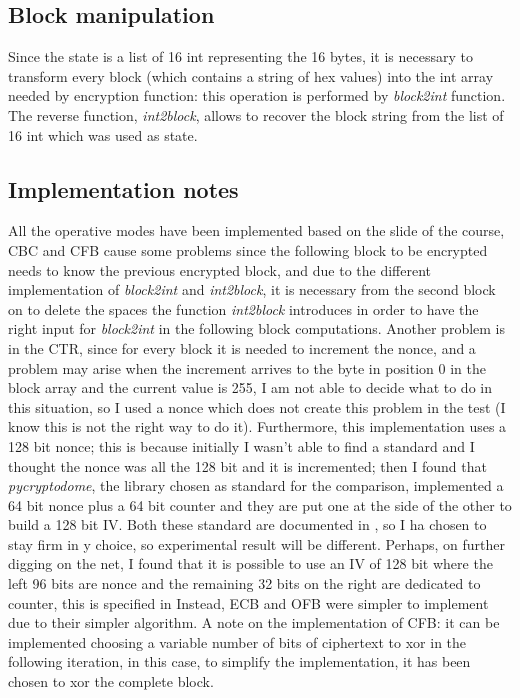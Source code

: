 \documentclass{article}
\begin{document}
\subsection{Block manipulation}

Since the state is a list of 16 int representing the 16 bytes, it is necessary to transform every block (which contains a string of hex values) into the int array needed by encryption function: this operation is performed by \textit{block2int} function. The reverse function, \textit{int2block}, allows to recover the block string from the list of 16 int which was used as state.  

\subsection{Implementation notes}

All the operative modes have been implemented based on the slide of the course, CBC and CFB cause some problems since the following block to be encrypted needs to know the previous encrypted block, and due to the different implementation of \textit{block2int} and \textit{int2block}, it is necessary from the second block on to delete the spaces the function \textit{int2block} introduces in order to have the right input for \textit{block2int} in the following block computations.
\newline
Another problem is in the CTR, since for every block it is needed to increment the nonce, and a problem may arise when the increment arrives to the byte in position 0 in the block array and the current value is 255, I am not able to decide what to do in this situation, so I used a nonce which does not create this problem in the test (I know this is not the right way to do it). Furthermore, this implementation uses a 128 bit nonce; this is because initially I wasn't able to find a standard and I thought the nonce was all the 128 bit and it is incremented; then I found that \textit{pycryptodome}, the library chosen as standard for the comparison, implemented a 64 bit nonce plus a 64 bit counter and they are put one at the side of the other to build a 128 bit IV. Both these standard are documented in \cite{NIST}, so I ha chosen to stay firm in y choice, so experimental result will be different. Perhaps, on further digging on the net, I found that it is possible to use an IV of 128 bit where the left 96 bits are nonce and the remaining 32 bits on the right are dedicated to counter, this is specified in \cite{stack}
\newline
Instead, ECB and OFB were simpler to implement due to their simpler algorithm.
\newline
A note on the implementation of CFB: it can be implemented choosing a variable number of bits of ciphertext to xor in the following iteration, in this case, to simplify the implementation, it has been chosen to xor the complete block. 
\end{document}
